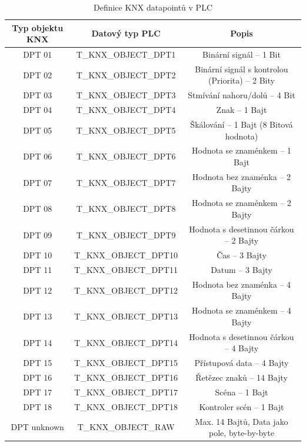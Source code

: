 \begin{table}[h]
    \caption[Definice KNX datapointů v PLC]{Definice KNX datapointů v PLC}
        \small
            \centering
            \begin{tabular}{|c|c|c|}
                \hline
                Typ objektu KNX & Datový typ PLC & Popis  \\
                \hline\hline
                DPT 01 & T\_KNX\_OBJECT\_DPT1 & Binární signál -- 1 Bit \\
                \hline
                DPT 02 & T\_KNX\_OBJECT\_DPT2 & Binární signál s kontrolou (Priorita) -- 2 Bity \\
                \hline
                DPT 03 & T\_KNX\_OBJECT\_DPT3 & Stmívání nahoru/dolů -- 4 Bit \\
                \hline
                DPT 04 & T\_KNX\_OBJECT\_DPT4 & Znak -- 1 Bajt \\
                \hline
                DPT 05 & T\_KNX\_OBJECT\_DPT5 & Škálování -- 1 Bajt (8 Bitová hodnota) \\
                \hline
                DPT 06 & T\_KNX\_OBJECT\_DPT6 & Hodnota se znaménkem -- 1 Bajt \\
                \hline
                DPT 07 & T\_KNX\_OBJECT\_DPT7 & Hodnota bez znaménka -- 2 Bajty \\
                \hline
                DPT 08 & T\_KNX\_OBJECT\_DPT8 & Hodnota se znaménkem -- 2 Bajty \\
                \hline
                DPT 09 & T\_KNX\_OBJECT\_DPT9 & Hodnota s desetinnou čárkou -- 2 Bajty\\
                \hline
                DPT 10 & T\_KNX\_OBJECT\_DPT10 & Čas -- 3 Bajty \\
                \hline
                DPT 11 & T\_KNX\_OBJECT\_DPT11 & Datum -- 3 Bajty \\
                \hline
                DPT 12 & T\_KNX\_OBJECT\_DPT12 & Hodnota bez znaménka -- 4 Bajty \\
                \hline
                DPT 13 & T\_KNX\_OBJECT\_DPT13 & Hodnota se znaménkem -- 4 Bajty \\
                \hline
                DPT 14 & T\_KNX\_OBJECT\_DPT14 & Hodnota s desetinnou čárkou -- 4 Bajty \\
                \hline
                DPT 15 & T\_KNX\_OBJECT\_DPT15 & Přístupová data -- 4 Bajty \\
                \hline
                DPT 16 & T\_KNX\_OBJECT\_DPT16 & Řetězec znaků -- 14 Bajty \\
                \hline
                DPT 17 & T\_KNX\_OBJECT\_DPT17 & Scéna -- 1 Bajt \\
                \hline
                DPT 18 & T\_KNX\_OBJECT\_DPT18 & Kontroler scén -- 1 Bajt \\
                \hline
                DPT unknown & T\_KNX\_OBJECT\_RAW & Max. 14 Bajtů, Data jako pole, byte-by-byte \\
                \hline
            \end{tabular}
\end{table}
